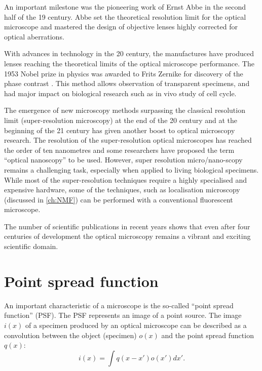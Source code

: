An important milestone was the pioneering work of Ernst Abbe \cite{Abbe1873} in the second half of the 19\ths{} century. Abbe set the theoretical resolution limit for the optical microscope and mastered the design of objective lenses highly corrected for optical aberrations.

With advances in technology in the 20\ths{} century, the manufactures have produced lenses reaching the theoretical limits of the optical microscope performance. The 1953 Nobel prize in physics was awarded to Frits Zernike for discovery of the phase contrast \cite{Zernike1942}. This method allows observation of transparent specimens, and had major impact on biological research such as in vivo study of cell cycle. 

The emergence of new microscopy methods surpassing the classical resolution limit (super-resolution microscopy) at the end of the 20\ths{} century and at the beginning of the 21\st{} century has given another boost to optical microscopy research. The resolution of the super-resolution optical microscopes has reached the order of ten nanometres and some researchers have proposed the term ``optical nanoscopy'' to be used. However, super resolution micro/nano-scopy remains a challenging task, especially when applied to living biological specimens. While most of the super-resolution techniques require a highly specialised and expensive hardware, some of the techniques, such as localisation microscopy (discussed in \autoref{ch:NMF}) can be performed with a conventional fluorescent microscope. 

The number of scientific publications in recent years shows that even after four centuries of development the optical microscopy remains a vibrant and exciting scientific domain.


\section{Point spread function}

An important characteristic of a microscope is the so-called ``point spread function'' (PSF). The PSF represents an image of a point source. The image $i(x)$ of a specimen produced by an optical microscope can be described as a convolution between the object (specimen) $o(x)$ and the point spread function $q(x)$:
%
\begin{equation}
	i(x)=\int q(x-x')o(x')dx'.
	\label{eq:conv}
\end{equation}  

